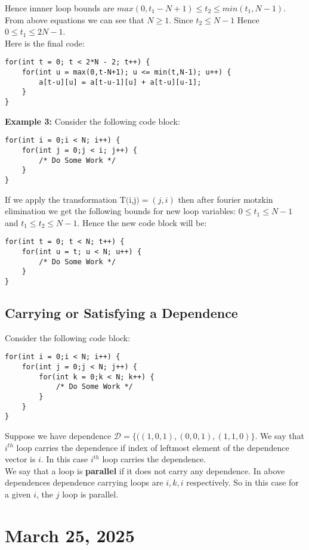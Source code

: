 \documentclass{article}
\begin{document}
Hence innner loop bounds are $\boxed{max(0,t_1-N+1) \leq t_2 \leq min(t_1,N-1)}$. From above equations we can see that $N \geq 1$. Since $t_2 \leq N-1$ Hence $0 \leq t_1 \leq 2N-1$. \\

Here is the final code:
\begin{lstlisting}
for(int t = 0; t < 2*N - 2; t++) {
    for(int u = max(0,t-N+1); u <= min(t,N-1); u++) {
        a[t-u][u] = a[t-u-1][u] + a[t-u][u-1];
    }
}
\end{lstlisting}

\textbf{Example 3: } Consider the following code block:
\begin{lstlisting}
for(int i = 0;i < N; i++) {
    for(int j = 0;j < i; j++) {
        /* Do Some Work */
    }
}
\end{lstlisting}

If we apply the transformation $\text{T(i,j)} = (j,i)$ then after fourier motzkin elimination we get the following bounds for new loop variables: $0 \leq t_1 \leq N-1$ and $t_1 \leq t_2 \leq N-1$. Hence the new code block will be:

\begin{lstlisting}
for(int t = 0; t < N; t++) {
    for(int u = t; u < N; u++) {
        /* Do Some Work */
    }
}
\end{lstlisting}

\subsection*{Carrying or Satisfying a Dependence}
Consider the following code block:
\begin{lstlisting}
for(int i = 0;i < N; i++) {
    for(int j = 0;j < N; j++) {
        for(int k = 0;k < N; k++) {
            /* Do Some Work */
        }
    }
}
\end{lstlisting}
Suppose we have dependence $\mathcal{D} = \{((1,0,1), (0,0,1), (1,1,0) \}$. We say that $i^{th}$ loop carries the dependence if index of leftmost element of the dependence vector is $i$. In this case $i^{th}$ loop carries the dependence. \\

We say that a loop is \textbf{parallel} if it does not carry any dependence. In above dependences dependence carrying loops are $i,k,i$ respectively. So in this case for a given $i$, the $j$ loop is parallel. \\

\section*{March 25, 2025}
\end{document}
